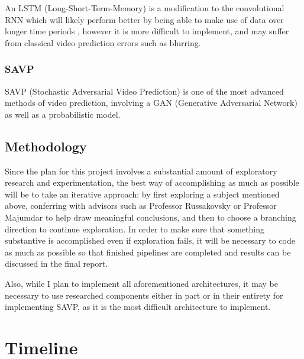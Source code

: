 \documentclass[10pt, letterpaper]{article}
\begin{document}
An LSTM (Long-Short-Term-Memory) is a modification to the convolutional RNN
which will likely perform better by being able to make use of data over longer
time periods \cite{lstm}, however it is more difficult to implement, and may
suffer from classical video prediction errors such as blurring.

\subsubsection{SAVP}

SAVP (Stochastic Adversarial Video Prediction) is one of the most advanced
methods of video prediction, involving a GAN (Generative Adversarial Network)
as well as a probabilistic model. \cite{savp}

\subsection{Methodology}

Since the plan for this project involves a substantial amount of exploratory
research and experimentation, the best way of accomplishing as much as possible
will be to take an iterative approach: by first exploring a subject mentioned
above, conferring with advisors such as Professor Russakovsky or Professor
Majumdar to help draw meaningful conclusions, and then to choose a branching
direction to continue exploration. In order to make sure that something
substantive is accomplished even if exploration fails, it will be necessary to
code as much as possible so that finished pipelines are completed and results
can be discussed in the final report.

Also, while I plan to implement all aforementioned architectures, it may be
necessary to use researched components either in part or in their entirety for
implementing SAVP, as it is the most difficult architecture to implement.

\section{Timeline}
\end{document}
